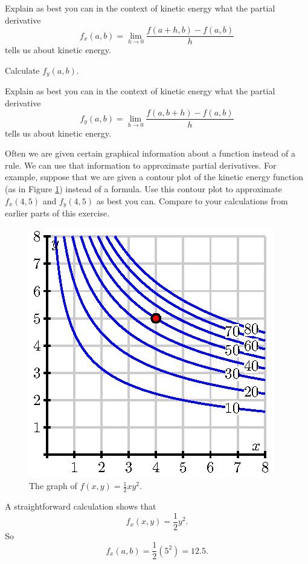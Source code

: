 \begin{exercises}
    \item Explain as best you can in the context of kinetic energy what the partial derivative
\[f_x(a,b) = \lim_{h \to 0} \frac{f(a+h,b) - f(a,b)}{h}\]
tells us about kinetic energy.

    \item Calculate $f_y(a,b)$.

    \item Explain as best you can in the context of kinetic energy what the partial derivative
\[f_y(a,b) = \lim_{h \to 0} \frac{f(a,b+h) - f(a,b)}{h}\]
tells us about kinetic energy.



     \item Often we are given certain graphical information about a function instead of a rule. We can use that information to approximate partial derivatives. For example, suppose that we are given a contour plot of the kinetic energy function (as in Figure \ref{F:10.2.pd_contour}) instead of a formula. Use this contour plot to approximate $f_x(4,5)$ and $f_y(4,5)$ as best you can. Compare to your calculations from earlier parts of this exercise.  
\begin{figure}[ht]
  \begin{center}
    \includegraphics{figures/fig_10_2_ke_contour.eps}
    \caption{The graph of $f(x,y) = \frac{1}{2}xy^2$.}
    \label{F:10.2.pd_contour}
  \end{center}
\end{figure}
    \ea
\begin{exerciseSolution}
    \ba
    \item A straightforward calculation shows that 
\[f_x(x,y) = \frac{1}{2}y^2.\]
So 
\[f_x(a,b) = \frac{1}{2}(5^2) = 12.5.\]


\end{exerciseSolution}
\end{exercises}
